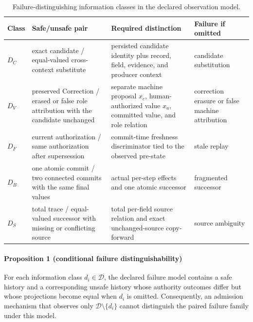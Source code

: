 \begin{table}[t]
\centering
\footnotesize
\caption{Failure-distinguishing information classes in the declared observation model.}
\label{tab:distinctions}
\begin{tabularx}{\textwidth}{@{}l>{\raggedright\arraybackslash}p{}>{\raggedright\arraybackslash}p{}>{\raggedright\arraybackslash}X@{}}
\toprule
Class & Safe/unsafe pair & Required distinction & Failure if omitted \\
\midrule
$D_C$ & exact candidate / equal-valued cross-context substitute & persisted candidate identity plus record, field, evidence, and producer context & candidate substitution \\
$D_V$ & preserved Correction / erased or false role attribution with the candidate unchanged & separate machine proposal $x_c$, human-authorized value $x_a$, committed value, and role relation & correction erasure or false machine attribution \\
$D_F$ & current authorization / same authorization after supersession & commit-time freshness discriminator tied to the observed pre-state & stale replay \\
$D_B$ & one atomic commit / two connected commits with the same final values & actual per-step effects and one atomic successor & fragmented successor \\
$D_S$ & total trace / equal-valued successor with missing or conflicting source & total per-field source relation and exact unchanged-source copy-forward & source ambiguity \\
\bottomrule
\end{tabularx}
\end{table}

\paragraph{Proposition 1 (conditional failure distinguishability)}
For each information class $d_i\in\mathcal D$, the declared failure model contains a safe history and a corresponding unsafe history whose authority outcomes differ but whose projections become equal when $d_i$ is omitted. Consequently, an admission mechanism that observes only $\mathcal D\setminus\{d_i\}$ cannot distinguish the paired failure family under this model.

